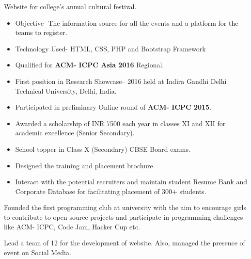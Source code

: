 \documentclass[9.5pt,a4paper]{altacv}
\begin{document}
\divider

Website for college’s annual cultural festival.
\begin{itemize}
\item Objective- The information source for all the events and a platform for the teams to register. 
\item Technology Used- HTML, CSS, PHP and Bootstrap Framework
\end{itemize}


\begin{itemize}
\item Qualified for \textbf{ACM- ICPC Asia 2016} Regional.
\item First position in Research Showcase– 2016 held at Indira Gandhi Delhi Technical University, Delhi, India. 
\item Participated in preliminary Online round of \textbf{ACM- ICPC 2015}.
\item Awarded a scholarship of INR 7500  each year in classes XI and XII for academic excellence (Senior Secondary).
\item School topper in Class X (Secondary) CBSE Board exams.
\end{itemize}


\begin{itemize}
\item Designed the training and placement brochure.
\item Interact with the potential recruiters and maintain student Resume Bank and Corporate Database for facilitating placement of 300+ students.
\end{itemize}

Founded the first programming club at university with the aim to encourage girls to contribute to open source projects and participate in programming challenges like ACM- ICPC, Code Jam, Hacker Cup etc.



Lead a team of 12 for the development of website. Also, managed the presence of event on Social Media.
\end{document}
